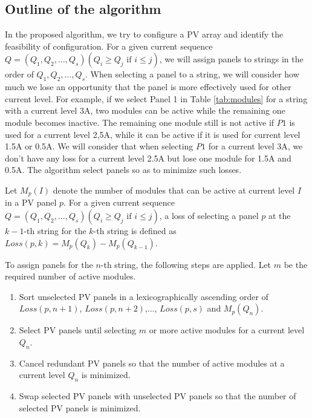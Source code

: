\documentclass[conference]{pvsctran}
\begin{document}
\subsection{Outline of the algorithm}
In the proposed algorithm, we try to configure a PV array and identify the feasibility of configuration.
For a given current sequence $Q = (Q_{1},Q_{2},\ldots ,Q_{s}) (Q_{i} \geq Q_{j} \mbox{\ if\ } i \leq j)$, we will assign panels to strings in the order of $Q_{1},Q_{2},\ldots ,Q_{s}$. 
When selecting a panel to a string, we will consider how much we lose an opportunity that the panel is more effectively used for other current level. 
For example, if we select Panel 1 in Table \ref{tab:modules} for a string with a current level 3A, two modules can be active while the remaining one module becomes inactive. 
The remaining one module still is not active if $P1$ is used for a current level 2,5A, while it can be active if it is used for current level 1.5A or 0.5A. 
We will consider that when selecting $P1$ for a current level 3A, we don't have any loss for a current level 2.5A but lose one module for 1.5A and 0.5A. 
The algorithm select panels so as to minimize such losses. 

Let $M_{p}(I)$ denote the number of modules that can be active at current level $I$ in a PV panel $p$. 
For a given current sequence $Q = (Q_{1},Q_{2},\ldots ,Q_{s}) (Q_{i} \geq Q_{j} \mbox{\ if\ } i \leq j)$, 
a loss of selecting a panel $p$ at the $k-1$-th string for the $k$-th string is defined as 
$Loss(p,k) = M_{p}(Q_{k}) - M_{p}(Q_{k-1})$. 

To assign panels for the $n$-th string, the following steps are applied. Let $m$ be the required number of active modules.
\begin{enumerate}
\item Sort unselected PV panels in a lexicographically ascending order of $Loss(p,n+1)$, $Loss(p,n+2)$,$\ldots$, $Loss(p,s)$ and $M_{p}(Q_{n})$.
\item Select PV panels until selecting $m$ or more active modules for a current level $Q_{n}$.
\item Cancel redundant PV panels so that the number of active modules at a current level $Q_{n}$ is minimized.
\item Swap selected PV panels with unselected PV panels so that the number of selected PV panels is minimized.
\end{enumerate}
\end{document}
